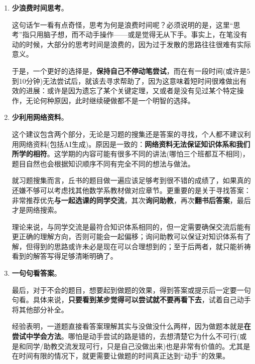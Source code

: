 \documentclass[a4paper,UTF8,fontset=windows,AutoFakeBold]{ctexart}
\begin{document}
\begin{enumerate}
    \item \textbf{少浪费时间思考}。
    
    这句话乍一看有点奇怪，思考为何是浪费时间呢？必须说明的是，这里``思考''指只用脑子想，而不动手操作——或是觉得无从下手。事实上，在笔没有动的时候，大部分的思考时间是浪费的，因为过于发散的思路往往很难有实际意义。

    于是，一个更好的选择是，\textbf{保持自己不停动笔尝试}，而在有一段时间(或许是5到10分钟)无法尝试后，就该去寻求帮助了，因为这意味着短时间很难做出有效的进展：或许是因为遗忘了某个关键定理，又或者是没有见过某个特定操作，无论何种原因，此时继续硬做都不是一个明智的选择。

    \item \textbf{少利用网络资料}。
    
    这个建议包含两个部分，无论是习题的搜集还是答案的寻找，个人都不建议利用网络资料(包括AI生成)。原因是一致的：\textbf{网络资料无法保证知识体系和我们所学的相符}。这学期的内容可能有很多不同的讲法(哪怕三个班都互不相同)，题目自然也会根据知识顺序不同有完全不同的想法与做法。

    就习题搜集而言，丘书的题目做一遍应该足够考到很不错的成绩了，如果真的还嫌不够可以考虑找其他数学系教材做对应章节。更重要的是关于寻找答案：非常推荐优先\textbf{与一起选课的同学交流}，其次\textbf{询问助教}，再次\textbf{翻书后答案}，最后才是网络搜索。
    
    理论来说，与同学交流是最符合知识体系相同的，但一定需要确保交流后能有更正确的理解方向，否则可能会一起偏移；询问助教可以保证对知识体系有了解，但得到的思路或许未必是现在可以合理想到的；至于后两者，就只能祈祷看到的解答写得足够清晰明确了。

    \item \textbf{一句句看答案}。
    
    最后，对于不会的题目，想要起到做题的效果，得到答案或提示后一定要一句句看。具体来说，\textbf{只要看到某步觉得可以尝试就不要再看下去}，试着自己动手将其他部分补全。

    经验表明，一道题直接看答案理解其实与没做没什么两样，因为做题本就是\textbf{在尝试中学会方法}。哪怕是动手尝试的路是错的，去想清楚它为什么不可行(或是和同学/助教交流发现可行，只是自己没做出来)也是非常有价值的。尤其是在时间有限的情况下，就更需要让做题的时间真正达到``动手''的效果。
\end{enumerate}
\end{document}
